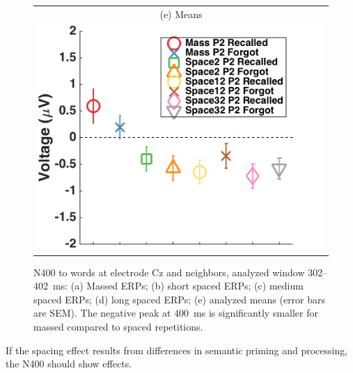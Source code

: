 \begin{figure}[hp]
\begin{tabular}{cc}
  \multicolumn{2}{c}{(e) Means} \\
  \multicolumn{2}{c}{\includegraphics[width=.35\textwidth]{./figs/exp2/tla_avg_ga_word_rc_mass_p2_word_fo_mass_p2_word_rc_spac2_p2_word_fo_spac2_p2_word_rc_spac12_p2_word_fo_spac12_p2_word_rc_spac32_p2_word_fo_spac32_p2_C_302_402_ylabel}} \\
  \end{tabular}
  \caption{N400 to words at electrode Cz and neighbors, analyzed window 302--402~ms: (a) Massed ERPs; (b) short spaced ERPs; (c) medium spaced ERPs; (d) long spaced ERPs; (e) analyzed means (error bars are SEM).  The negative peak at 400~ms is significantly smaller for massed compared to spaced repetitions.}
  \label{fig:s2_N400}
\end{figure}


If the spacing effect results from differences in semantic priming and processing, the N400 should show effects.



